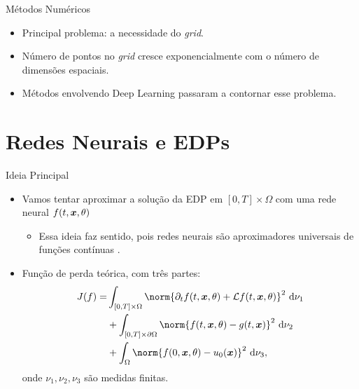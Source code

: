\documentclass[13pt]{beamer}
\begin{document}
\begin{frame}{Métodos Numéricos}
    \begin{itemize}
        \item<1-> Principal problema: a necessidade do \emph{grid}.
        \item<2-> Número de pontos no \emph{grid} cresce exponencialmente com o número de dimensões espaciais.
        \item<3-> Métodos envolvendo Deep Learning passaram a contornar esse problema.
    \end{itemize}
\end{frame}

\section{Redes Neurais e EDPs}

\begin{frame}{Ideia Principal}
    \begin{itemize}
        \item<1-> Vamos tentar aproximar a solução da EDP em \( [0, T] \times \Omega \) com uma rede neural \( f ( t, \bm{x}, \theta ) \)
            \begin{itemize}
                \item<2-> Essa ideia faz sentido, pois redes neurais são aproximadores universais de funções contínuas \cite{hornik91}.
            \end{itemize}
        \item<3-> Função de perda teórica, com três partes:
            \begin{align*}
                J ( f ) = &\int_{ [0, T] \times \Omega } \norm{ \partial_{ t } f ( t, \bfx, \theta ) + \mathcal{L} f ( t, \bfx, \theta ) }^2 \ \mathrm{d}\nu_{ 1 } \\
                &+ \int_{ [0, T] \times \partial \Omega } \norm{ f ( t, \bfx, \theta ) - g ( t, \bfx ) }^2 \ \mathrm{d}\nu_{ 2 } \\
                &+ \int_{ \Omega } \norm{ f ( 0, \bfx, \theta ) - u_{ 0 } ( \bfx ) }^2 \ \mathrm{d}\nu_{ 3 }
            ,\end{align*}
            onde \( \nu_{ 1 }, \nu_{ 2 }, \nu_{ 3 } \) são medidas finitas.
    \end{itemize}
\end{frame}
\end{document}
